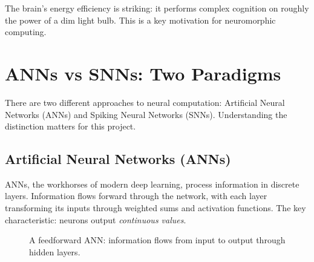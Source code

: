 \documentclass[11pt,a4paper]{article}
\begin{document}
The brain's energy efficiency is striking: it performs complex cognition on roughly the power of a dim light bulb. This is a key motivation for neuromorphic computing.

\section{ANNs vs SNNs: Two Paradigms}

There are two different approaches to neural computation: Artificial Neural Networks (ANNs) and Spiking Neural Networks (SNNs). Understanding the distinction matters for this project.

\subsection{Artificial Neural Networks (ANNs)}

ANNs, the workhorses of modern deep learning, process information in discrete layers. Information flows forward through the network, with each layer transforming its inputs through weighted sums and activation functions. The key characteristic: neurons output \textit{continuous values}.

\begin{figure}[H]
\centering
{}
\caption{A feedforward ANN: information flows from input to output through hidden layers.}
\end{figure}
\end{document}
